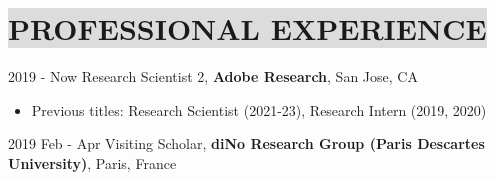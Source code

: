\section*{
    \colorbox{gainsboro}{PROFESSIONAL EXPERIENCE}
}

2019 - Now \hspace{15mm} 
Research Scientist 2, \textbf{Adobe Research},  San Jose, CA
\vspace{-1mm}
\begin{itemize}[noitemsep,itemsep=0pt,topsep=0pt,leftmargin=38mm]
    \item Previous titles: Research Scientist (2021-23), Research Intern (2019, 2020)
\end{itemize}




2019 Feb - Apr \hspace{10mm} 
Visiting Scholar, \textbf{diNo Research Group (Paris Descartes University)}, Paris, France

